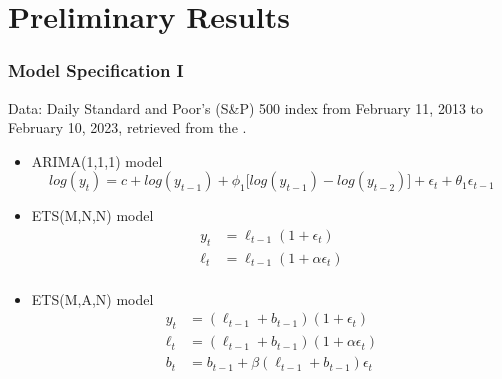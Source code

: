 
\section{Preliminary Results}


\begin{frame}
    \frametitle{Model Specification I}
    
\small{Data: Daily Standard and Poor’s (S\&P) 500 index from February 11, 2013 to February 10, 2023, retrieved from the \cite{SP500}.}

\vspace{2mm}

    \begin{itemize}
    \item ARIMA(1,1,1) model 
        \begin{equation*}
        log(y_t) = c + log(y_{t-1}) + \phi_1\big[log(y_{t-1})-log(y_{t-2})\big] + \epsilon_t + \theta_1\epsilon_{t-1}
        \end{equation*}
    \item ETS(M,N,N) model
        \begin{align*}
        y_t &= \ell_{t-1} (1+\epsilon_t) \\
        \ell_t &= \ell_{t-1} (1+\alpha \epsilon_t) \\
        \end{align*}
        \vspace{-1cm}
    \item ETS(M,A,N) model
        \begin{align*}
        y_t &= (\ell_{t-1} + b_{t-1})(1+\epsilon_t) \\
        \ell_t &= (\ell_{t-1} + b_{t-1}) (1+\alpha \epsilon_t) \\
        b_t &= b_{t-1} + \beta (\ell_{t-1} + b_{t-1})\epsilon_t \\
        \end{align*}
    \end{itemize}

\end{frame}

